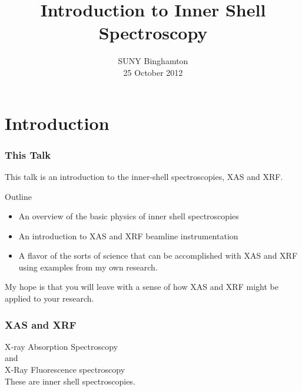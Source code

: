 \documentclass[10pt, xcolor=x11names, compress]{beamer}
\title{Introduction to Inner Shell Spectroscopy}
\date{SUNY Binghamton\\25 October 2012}
\begin{document}
\maketitle


\section[Introduction]{Introduction}

\begin{frame}
  \frametitle{This Talk}
  
  This talk is an introduction to the inner-shell spectroscopies, XAS
  and XRF.

  \bigskip

  \begin{block}{Outline}
    \begin{itemize}
    \item An overview of the basic physics of inner shell spectroscopies
    \item An introduction to XAS and XRF beamline instrumentation
    \item A flavor of the sorts of science that can be accomplished
      with XAS and XRF using examples from my own research.
    \end{itemize}
  \end{block}

  \bigskip

  My hope is that you will leave with a sense of how XAS and XRF might
  be applied to \alert{your} research.
\end{frame}

\begin{frame}
  \frametitle{XAS and XRF}

  \begin{center}
    \Large
    \alert{X}-ray \alert{A}bsorption \alert{S}pectroscopy\\
    and\\
    \alert{X}-\alert{R}ay \alert{F}luorescence spectroscopy\\[3ex]
    These are {\color{Firebrick4}inner shell}
    {\color{Purple4}spectroscopies}.
  \end{center}

  \begin{columns}[T]
    \begin{column}{0.5\linewidth}
    \end{column}
    \begin{column}{0.5\linewidth}
    \end{column}
  \end{columns}
\end{frame}
\end{document}
